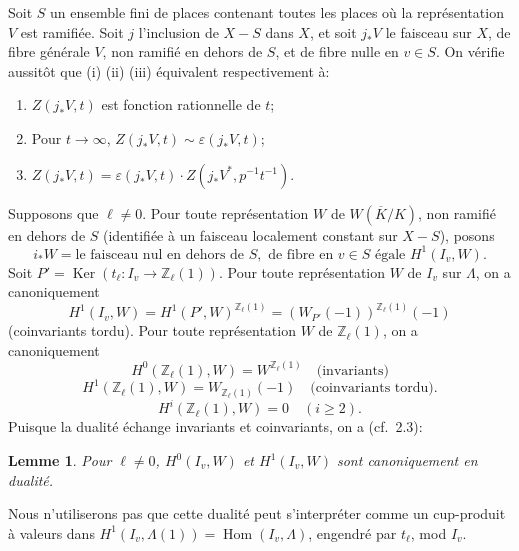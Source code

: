 \documentclass[11pt,a4paper]{amsart}
\theoremstyle{plain}
\newtheorem{lemma}[theorem]{Lemme}
\theoremstyle{definition}
\DeclareMathOperator{\Hom}{Hom}
\DeclareMathOperator{\Ker}{Ker}
\newcommand{\dbZ}{\mathbb{Z}}
\newcommand{\ov}[1]{\overline{#1}}
\newcommand{\eps}{\varepsilon}
\begin{document}
Soit $S$ un ensemble fini de places contenant toutes les places o\`u la repr\'esentation $V$ est ramifi\'ee. Soit $j$ l'inclusion de $X-S$ dans $X$, et soit $j_{*}V$ le faisceau sur $X$, de fibre g\'en\'erale $V$, non ramifi\'e en dehors de $S$, et de fibre nulle en $v \in S$. On v\'erifie aussit\^ot que (i) (ii) (iii) \'equivalent respectivement \`a:
\begin{enumerate}
\item[(i$'$)] $Z(j_{*}V,t)$ est fonction rationnelle de $t$;
\item[(ii$'$)] Pour $t \to \infty$, $Z(j_{*}V,t) \sim \eps(j_{*}V,t)$;
\item[(iii$'$)] $Z(j_{*}V,t) = \eps(j_{*}V,t) \cdot Z(j_{*}V^{*},p^{-1}t^{-1})$.
\end{enumerate}

Supposons que $\ell \not= 0$. Pour toute repr\'esentation $W$ de $W(\ov{K}/K)$, non ramifi\'e en dehors de $S$ (identifi\'ee \`a un faisceau localement constant sur $X-S$), posons
\begin{equation}
i_{*}W = \text{le faisceau nul en dehors de } S, \text{ de fibre en } v \in S \text{ \'egale } H^{1}(I_{v}, W).
\end{equation}
Soit $P' = \Ker(t_{\ell}: I_{v} \to \dbZ_{\ell}(1))$. Pour toute repr\'esentation $W$ de $I_{v}$ sur $\Lambda$, on a canoniquement
\begin{equation}
H^{1}(I_{v}, W) = H^{1}(P', W)^{\dbZ_{\ell}(1)} = (W_{P'}(-1))^{\dbZ_{\ell}(1)}(-1)
\end{equation}
(coinvariants tordu). Pour toute repr\'esentation $W$ de $\dbZ_{\ell}(1)$, on a canoniquement
\begin{equation}
H^{0}(\dbZ_{\ell}(1), W) = W^{\dbZ_{\ell}(1)} \quad \text{(invariants)}
\end{equation}
\begin{equation}
H^{1}(\dbZ_{\ell}(1), W) = W_{\dbZ_{\ell}(1)}(-1) \quad \text{(coinvariants tordu)}.
\end{equation}
\[
H^{i}(\dbZ_{\ell}(1), W) = 0 \quad (i \geq 2).
\]
Puisque la dualit\'e \'echange invariants et coinvariants, on a (cf.~2.3):

\begin{lemma}\label{lem7.11.4}
Pour $\ell \not= 0$, $H^{0}(I_{v}, W)$ et $H^{1}(I_{v}, W)$ sont canoniquement en dualit\'e.
\end{lemma}

Nous n'utiliserons pas que cette dualit\'e peut s'interpr\'eter comme un cup-produit \`a valeurs dans $H^{1}(I_{v}, \Lambda(1)) = \Hom(I_{v}, \Lambda)$, engendr\'e par $t_{\ell}$, mod $I_{v}$.
\end{document}
